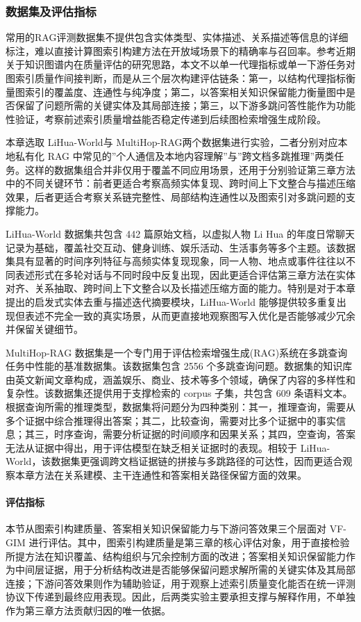 \documentclass[promaster, vlined]{DissertUESTC}
\begin{document}
\subsubsection{数据集及评估指标}

常用的RAG评测数据集不提供包含实体类型、实体描述、关系描述等信息的详细标注，难以直接计算图索引构建方法在开放域场景下的精确率与召回率。参考近期关于知识图谱内在质量评估的研究思路\cite{chepurova2025wikontic}，本文不以单一代理指标或单一下游任务对图索引质量作间接判断，而是从三个层次构建评估链条：第一，以结构代理指标衡量图索引的覆盖度、连通性与纯净度；第二，以答案相关知识保留能力衡量图中是否保留了问题所需的关键实体及其局部连接；第三，以下游多跳问答性能作为功能性验证，考察前述索引质量增益能否稳定传递到后续图检索增强生成阶段。

本章选取 LiHua-World\cite{fan2024minirag}与 MultiHop-RAG\cite{tang2024multihoprag}两个数据集进行实验，二者分别对应本地私有化 RAG 中常见的”个人通信及本地内容理解”与”跨文档多跳推理”两类任务。这样的数据集组合并非仅用于覆盖不同应用场景，还用于分别验证第三章方法中的不同关键环节：前者更适合考察高频实体复现、跨时间上下文整合与描述压缩效果，后者更适合考察关系链完整性、局部结构连通性以及图索引对多跳问题的支撑能力。

LiHua-World 数据集共包含 442 篇原始文档，以虚拟人物 Li Hua 的年度日常聊天记录为基础，覆盖社交互动、健身训练、娱乐活动、生活事务等多个主题。该数据集具有显著的时间序列特征与高频实体复现现象，同一人物、地点或事件往往以不同表述形式在多轮对话与不同时段中反复出现，因此更适合评估第三章方法在实体对齐、关系抽取、跨时间上下文整合以及长描述压缩方面的能力。特别是对于本章提出的启发式实体去重与描述迭代摘要模块，LiHua-World 能够提供较多重复出现但表述不完全一致的真实场景，从而更直接地观察图写入优化是否能够减少冗余并保留关键细节。

MultiHop-RAG 数据集是一个专门用于评估检索增强生成(RAG)系统在多跳查询任务中性能的基准数据集。该数据集包含 2556 个多跳查询问题。数据集的知识库由英文新闻文章构成，涵盖娱乐、商业、技术等多个领域，确保了内容的多样性和复杂性。该数据集还提供用于支撑检索的 corpus 子集，共包含 609 条语料文本。
根据查询所需的推理类型，数据集将问题分为四种类别：其一，推理查询，需要从多个证据中综合推理得出答案；其二，比较查询，需要对比多个证据中的事实信息；其三，时序查询，需要分析证据的时间顺序和因果关系；其四，空查询，答案无法从证据中得出，用于评估模型在缺乏相关证据时的表现。相较于 LiHua-World，该数据集更强调跨文档证据链的拼接与多跳路径的可达性，因而更适合观察本章方法在关系建模、主干连通性和答案相关路径保留方面的效果。

\paragraph{评估指标}
本节从图索引构建质量、答案相关知识保留能力与下游问答效果三个层面对 VF-GIM 进行评估。其中，图索引构建质量是第三章的核心评估对象，用于直接检验所提方法在知识覆盖、结构组织与冗余控制方面的改进；答案相关知识保留能力作为中间层证据，用于分析结构改进是否能够保留问题求解所需的关键实体及其局部连接；下游问答效果则作为辅助验证，用于观察上述索引质量变化能否在统一评测协议下传递到最终应用表现。因此，后两类实验主要承担支撑与解释作用，不单独作为第三章方法贡献归因的唯一依据。
\end{document}
